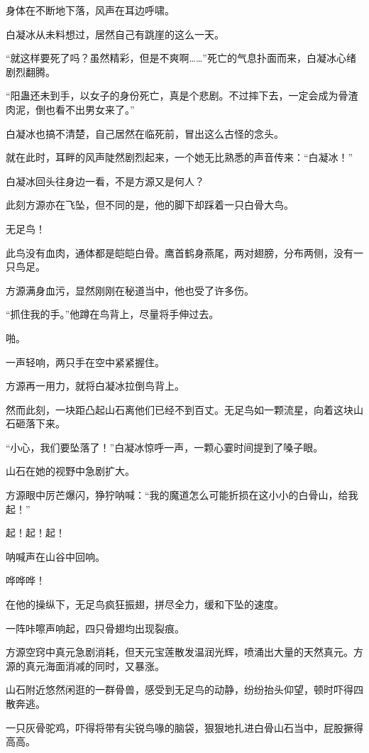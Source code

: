 \begin{this_body}
身体在不断地下落，风声在耳边呼啸。

白凝冰从未料想过，居然自己有跳崖的这么一天。

“就这样要死了吗？虽然精彩，但是不爽啊……”死亡的气息扑面而来，白凝冰心绪剧烈翻腾。

“阳蛊还未到手，以女子的身份死亡，真是个悲剧。不过摔下去，一定会成为骨渣肉泥，倒也看不出男女来了。”

白凝冰也搞不清楚，自己居然在临死前，冒出这么古怪的念头。

就在此时，耳畔的风声陡然剧烈起来，一个她无比熟悉的声音传来：“白凝冰！”

白凝冰回头往身边一看，不是方源又是何人？

此刻方源亦在飞坠，但不同的是，他的脚下却踩着一只白骨大鸟。

无足鸟！

此鸟没有血肉，通体都是皑皑白骨。鹰首鹤身燕尾，两对翅膀，分布两侧，没有一只鸟足。

方源满身血污，显然刚刚在秘道当中，他也受了许多伤。

“抓住我的手。”他蹲在鸟背上，尽量将手伸过去。

啪。

一声轻响，两只手在空中紧紧握住。

方源再一用力，就将白凝冰拉倒鸟背上。

然而此刻，一块距凸起山石离他们已经不到百丈。无足鸟如一颗流星，向着这块山石砸落下来。

“小心，我们要坠落了！”白凝冰惊呼一声，一颗心霎时间提到了嗓子眼。

山石在她的视野中急剧扩大。

方源眼中厉芒爆闪，狰狞呐喊：“我的魔道怎么可能折损在这小小的白骨山，给我起！”

起！起！起！

呐喊声在山谷中回响。

哗哗哗！

在他的操纵下，无足鸟疯狂振翅，拼尽全力，缓和下坠的速度。

一阵咔嚓声响起，四只骨翅均出现裂痕。

方源空窍中真元急剧消耗，但天元宝莲散发温润光辉，喷涌出大量的天然真元。方源的真元海面消减的同时，又暴涨。

山石附近悠然闲逛的一群骨兽，感受到无足鸟的动静，纷纷抬头仰望，顿时吓得四散奔逃。

一只灰骨驼鸡，吓得将带有尖锐鸟喙的脑袋，狠狠地扎进白骨山石当中，屁股撅得高高。


\end{this_body}
